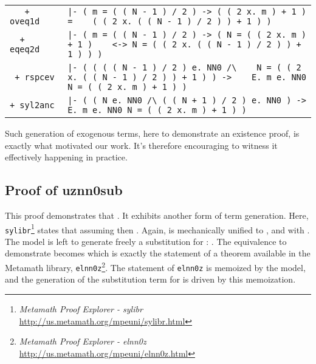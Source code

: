 \documentclass{article}
\begin{document}
\begin{tabular}{ |l|p{105mm}| }
\verb|   + oveq1d   | & \verb!|- ( m = ( ( N - 1 ) / 2 ) -> ( ( 2 x. m ) + 1 ) = !\newline\verb!   ( ( 2 x. ( ( N - 1 ) / 2 ) ) + 1 ) )! \\
\verb|  + eqeq2d    | & \verb!|- ( m = ( ( N - 1 ) / 2 ) -> ( N = ( ( 2 x. m ) + 1 ) !\newline\verb!   <-> N = ( ( 2 x. ( ( N - 1 ) / 2 ) ) + 1 ) ) )! \\
\verb| + rspcev     | & \verb!|- ( ( ( ( N - 1 ) / 2 ) e. NN0 /\ !\newline\verb!   N = ( ( 2 x. ( ( N - 1 ) / 2 ) ) + 1 ) ) -> !\newline\verb!   E. m e. NN0 N = ( ( 2 x. m ) + 1 ) )! \\
\verb|+ syl2anc     | & \verb!|- ( ( N e. NN0 /\ ( ( N + 1 ) / 2 ) e. NN0 ) -> !\newline\verb!   E. m e. NN0 N = ( ( 2 x. m ) + 1 ) )! \\
\hline
\end{tabular}

Such generation of exogenous terms, here to demonstrate an existence proof, is exactly what motivated our work. It's therefore encouraging to witness it effectively happening in practice.

\subsection{Proof of \textbf{uznn0sub}}

This proof demonstrates that . It exhibits another form of term generation. Here, \verb|sylibr|\footnote{\textit{Metamath Proof Explorer - sylibr} \url{http://us.metamath.org/mpeuni/sylibr.html}} states that assuming  then . Again,  is mechanically unified to , and  with . The model is left to generate freely a substitution for : . The equivalence  to demonstrate becomes  which is exactly the statement of a theorem available in the Metamath library, \verb|elnn0z|\footnote{\textit{Metamath Proof Explorer - elnn0z} \url{http://us.metamath.org/mpeuni/elnn0z.html}}. The statement of \verb|elnn0z| is memoized by the model, and the generation of the substitution term for  is driven by this memoization.
\end{document}
